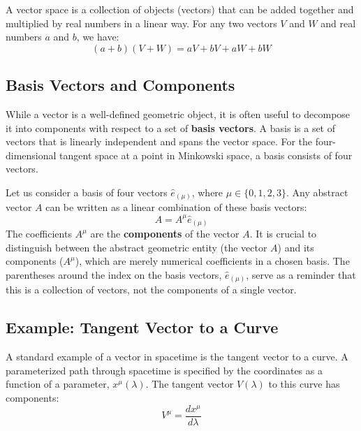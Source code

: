 \documentclass[11pt, a4paper]{report}
\begin{document}
%
%
%
%

A vector space is a collection of objects (vectors) that can be added together and multiplied by real numbers in a linear way. For any two vectors $V$ and $W$ and real numbers $a$ and $b$, we have:
\begin{equation}
    (a+b)(V+W) = aV + bV + aW + bW
\end{equation}

\subsection*{Basis Vectors and Components}

While a vector is a well-defined geometric object, it is often useful to decompose it into components with respect to a set of \textbf{basis vectors}. A basis is a set of vectors that is linearly independent and spans the vector space. For the four-dimensional tangent space at a point in Minkowski space, a basis consists of four vectors.

Let us consider a basis of four vectors $\hat{e}_{(\mu)}$, where $\mu \in \{0, 1, 2, 3\}$. Any abstract vector $A$ can be written as a linear combination of these basis vectors:
\begin{equation}
    A = A^\mu \hat{e}_{(\mu)}
\end{equation}
The coefficients $A^\mu$ are the \textbf{components} of the vector $A$. It is crucial to distinguish between the abstract geometric entity (the vector $A$) and its components ($A^\mu$), which are merely numerical coefficients in a chosen basis. The parentheses around the index on the basis vectors, $\hat{e}_{(\mu)}$, serve as a reminder that this is a collection of vectors, not the components of a single vector.

\subsection*{Example: Tangent Vector to a Curve}

A standard example of a vector in spacetime is the tangent vector to a curve. A parameterized path through spacetime is specified by the coordinates as a function of a parameter, $x^\mu(\lambda)$. The tangent vector $V(\lambda)$ to this curve has components:
\begin{equation}
    V^\mu = \frac{dx^\mu}{d\lambda}
\end{equation}
\end{document}
